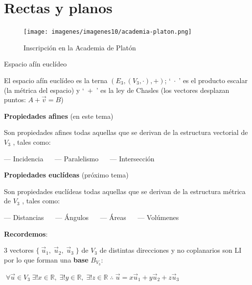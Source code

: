 
\chapter{Rectas y planos}
	
\begin{myblock}

	\begin{figure}[H]
		\centering
		\texttt{[image: imagenes/imagenes10/academia-platon.png]}
		\caption*{Inscripción en la Academia de Platón}
	\end{figure}
\end{myblock}

\begin{myexampleblock}{Espacio afín euclídeo}
 
El espacio afín euclídeo es la terna $(E_3 ,(V_3 ,\cdot) ,+)$; `$\; \cdot \; $'  es el producto escalar (la métrica del espacio) y `$\; + \; $' es la ley de Chasles (los vectores desplazan puntos: $A+\vec v = B$)

\vspace{4mm}\textbf{Propiedades afines} (en este tema)

\vspace{2mm}Son propiedades afines todas aquellas que se derivan de la estructura vectorial de $V_3$ , tales como: 

\vspace{2mm}--- Incidencia $\quad$ --- Paralelismo $\quad$ --- Intersección  

\vspace{4mm}\textbf{Propiedades euclídeas} (próximo tema)

\vspace{2mm}Son propiedades euclídeas todas aquellas que se derivan de la estructura métrica de $V_3$ , tales como: 

\vspace{2mm}--- Distancias $\quad$ --- Ángulos $\quad$ --- Áreas $\quad$ --- Volúmenes 

\end{myexampleblock}

 
\textbf{Recordemos}:

$3$ vectores $\{ \; \vec u_1,\; \vec u_2, \; \vec u_3 \; \}$ de $V_3$ de distintas direcciones y no coplanarios son LI por lo que forman una \textbf{base} $B_{V_3}$: 

$\; \forall \vec u \in V_3\; \exists ! x \in \mathbb R, \; \exists ! y \in \mathbb R, \; \exists ! z \in \mathbb R\; \therefore \; \vec u=x\vec u_1+y \vec u_2+z \vec u_3$


